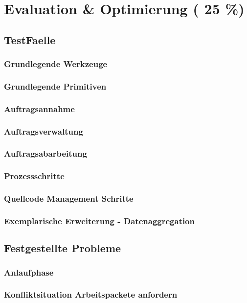 \chapter{Evaluation \& Optimierung ( 25 \%)}

\section{TestFaelle}
\subsection{Grundlegende Werkzeuge}
\subsection{Grundlegende Primitiven}
\subsection{Auftragsannahme}
\subsection{Auftragsverwaltung}
\subsection{Auftragsabarbeitung}
\subsection{Prozessschritte}
\subsection{Quellcode Management Schritte}
\subsection{Exemplarische Erweiterung - Datenaggregation}


\section{Festgestellte Probleme}

\subsection{Anlaufphase}
\subsection{Konfliktsituation Arbeitspackete anfordern}
